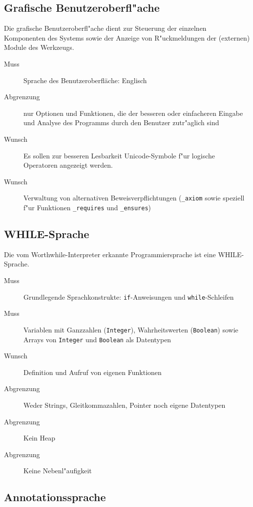 \subsection{Grafische Benutzeroberfl"ache}%

Die grafische Benutzeroberfl"ache dient zur Steuerung der einzelnen Komponenten des Systems sowie der Anzeige von R"uckmeldungen der (externen) \see Module des Werkzeugs.%

\begin{description}%
    \item [Muss] Sprache des Benutzeroberfläche: Englisch%
    \item [Abgrenzung] nur Optionen und Funktionen, die der besseren oder einfacheren Eingabe und Analyse des Programms durch den Benutzer zutr"aglich sind%
    \item [Wunsch] Es sollen zur besseren Lesbarkeit \see Unicode-Symbole f"ur \see logische Operatoren angezeigt werden.%
    \item [Wunsch] Verwaltung von alternativen \see Beweisverpflichtungen (\texttt{\_axiom} sowie speziell f"ur Funktionen \texttt{\_requires} und \texttt{\_ensures})%
\end{description}%

\subsection{WHILE-Sprache}%

Die vom Worthwhile-Interpreter erkannte Programmiersprache ist eine \see WHILE-Sprache.%

\begin{description}%
    \item [Muss] Grundlegende Sprachkonstrukte: \texttt{if}-Anweisungen und \texttt{while}-Schleifen%
    \item [Muss] Variablen mit Ganzzahlen (\texttt{Integer}), Wahrheitswerten (\texttt{Boolean}) sowie Arrays von \texttt{Integer} und \texttt{Boolean} als Datentypen%
    \item [Wunsch] Definition und Aufruf von eigenen Funktionen%
    \item [Abgrenzung] Weder Strings, Gleitkommazahlen, Pointer noch eigene Datentypen%
    \item [Abgrenzung] Kein \see Heap%
    \item [Abgrenzung] Keine \see Nebenl"aufigkeit%
\end{description}%

\subsection{Annotationssprache}%

